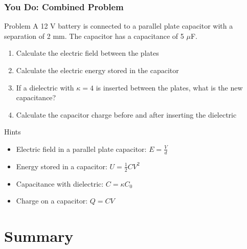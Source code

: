 \documentclass{beamer}
\begin{document}
\begin{frame}
    \frametitle{You Do: Combined Problem}
    \begin{block}{Problem}
        A 12 V battery is connected to a parallel plate capacitor with a separation of 2 mm. The capacitor has a capacitance of 5 $\mu$F.
        \begin{enumerate}
            \item Calculate the electric field between the plates
            \item Calculate the electric energy stored in the capacitor
            \item If a dielectric with $\kappa = 4$ is inserted between the plates, what is the new capacitance?
            \item Calculate the capacitor charge before and after inserting the dielectric
        \end{enumerate}
    \end{block}
    
    \begin{alertblock}{Hints}
        \begin{itemize}
            \item Electric field in a parallel plate capacitor: $E = \frac{V}{d}$
            \item Energy stored in a capacitor: $U = \frac{1}{2}CV^2$
            \item Capacitance with dielectric: $C = \kappa C_0$
            \item Charge on a capacitor: $Q = CV$
        \end{itemize}
    \end{alertblock}
\end{frame}

\section{Summary}
\end{document}
